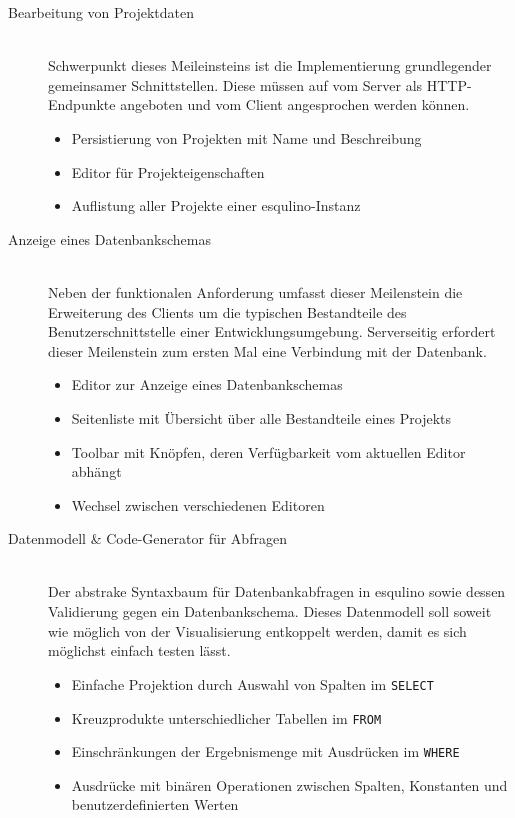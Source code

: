 \begin{description}
\item[Bearbeitung von Projektdaten] \hfill \\
  Schwerpunkt dieses Meileinsteins ist die Implementierung grundlegender gemeinsamer Schnittstellen. Diese müssen auf vom Server als HTTP-Endpunkte angeboten und vom Client angesprochen werden können.
  \begin{itemize}
  \item Persistierung von Projekten mit Name und Beschreibung
  \item Editor für Projekteigenschaften
  \item Auflistung aller Projekte einer esqulino-Instanz
  \end{itemize}
\item [Anzeige eines Datenbankschemas] \hfill \\
  Neben der funktionalen Anforderung umfasst dieser Meilenstein die Erweiterung des Clients um die typischen Bestandteile des Benutzerschnittstelle einer Entwicklungsumgebung. Serverseitig erfordert dieser Meilenstein zum ersten Mal eine Verbindung mit der Datenbank.
  \begin{itemize}
  \item Editor zur Anzeige eines Datenbankschemas
  \item Seitenliste mit Übersicht über alle Bestandteile eines Projekts
  \item Toolbar mit Knöpfen, deren Verfügbarkeit vom aktuellen Editor abhängt
  \item Wechsel zwischen verschiedenen Editoren
  \end{itemize}
\item [Datenmodell \& Code-Generator für Abfragen] \hfill \\
  Der abstrake Syntaxbaum für Datenbankabfragen in esqulino sowie dessen Validierung gegen ein Datenbankschema. Dieses Datenmodell soll soweit wie möglich von der Visualisierung entkoppelt werden, damit es sich möglichst einfach testen lässt.
  \begin{itemize}
  \item Einfache Projektion durch Auswahl von Spalten im \texttt{SELECT}
  \item Kreuzprodukte unterschiedlicher Tabellen im \texttt{FROM}
  \item Einschränkungen der Ergebnismenge mit Ausdrücken im \texttt{WHERE}
  \item Ausdrücke mit binären Operationen zwischen Spalten, Konstanten und benutzerdefinierten Werten

\end{itemize}
\end{description}
